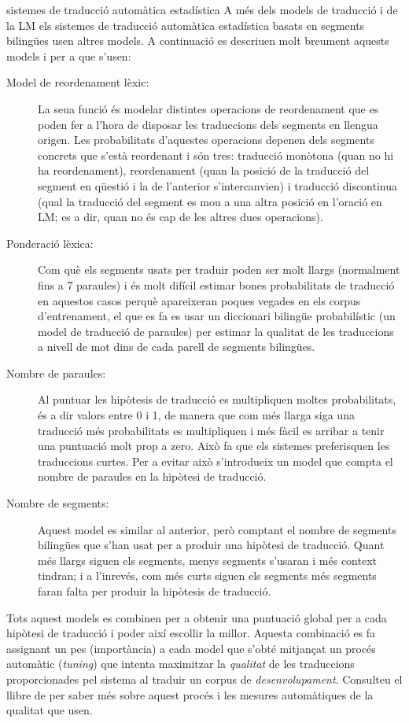 \begin{persabermes}{sistemes de traducció automàtica estadística}
  A més dels models de traducció i de la LM els sistemes de traducció
  automàtica estadística basats en segments bilingües usen altres
  models. A continuació es descriuen molt breument aquests models i
  per a que s'usen:
  \begin{description}
  \item[Model de reordenament lèxic:] La seua funció és modelar
    distintes operacions de reordenament que es poden fer a l'hora de
    disposar les traduccions dels segments en llengua origen. Les
    probabilitats d'aquestes operacions depenen dels segments concrets
    que s'està reordenant i són tres: traducció monòtona (quan no hi
    ha reordenament), reordenament (quan la posició de la traducció
    del segment en qüestió i la de l'anterior s'intercanvien) i
    traducció discontinua (qual la traducció del segment es mou a una
    altra posició en l'oració en LM; es a dir, quan no és cap de les
    altres dues operacions).
  \item[Ponderació lèxica:] Com què els segments usats per traduir
    poden ser molt llargs (normalment fins a 7 paraules) i és molt
    difícil estimar bones probabilitats de traducció en aquestos casos
    perquè apareixeran poques vegades en els corpus d'entrenament, el
    que es fa es usar un diccionari bilingüe probabilístic (un model
    de traducció de paraules) per estimar la qualitat de les
    traduccions a nivell de mot dins de cada parell de segments
    bilingües.
  \item[Nombre de paraules:] Al puntuar les hipòtesis de traducció es
    multipliquen moltes probabilitats, és a dir valors entre 0 i 1, de
    manera que com més llarga siga una traducció més probabilitats es
    multipliquen i més fàcil es arribar a tenir una puntuació molt
    prop a zero. Això fa que els sistemes preferisquen les traduccions
    curtes. Per a evitar això s'introdueix un model que compta el
    nombre de paraules en la hipòtesi de traducció.
  \item[Nombre de segments:] Aquest model es similar al anterior, però
    comptant el nombre de segments bilingües que s'han usat per a
    produir una hipòtesi de traducció. Quant més llargs siguen els
    segments, menys segments s'usaran i més context tindran; i a
    l'inrevés, com més curts siguen els segments més segments faran
    falta per produir la hipòtesis de traducció.
  \end{description}

  Tots aquest models es combinen per a obtenir una puntuació global
  per a cada hipòtesi de traducció i poder així escollir la
  millor. Aquesta combinació es fa assignant un pes (importància) a
  cada model que s'obté mitjançat un procés automàtic (\emph{tuning})
  que intenta maximitzar la \emph{qualitat} de les traduccions
  proporcionades pel sistema al traduir un corpus de
  \emph{desenvolupament}. Consulteu el llibre de \citet{koehnbook} per
  saber més sobre aquest procés i les mesures automàtiques de la
  qualitat que usen.
\end{persabermes}


